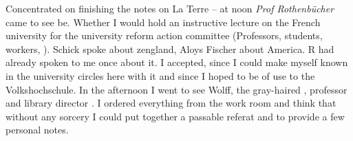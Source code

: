 
Concentrated on finishing the notes on La Terre -- at noon \textit{Prof Rothenbücher} came to see be. Whether I would hold an instructive lecture on the French university for the university reform action committee (Professors, students, workers, ). Schick spoke about zengland, Aloys Fischer about America. R had already spoken to me once about it. I accepted, since I could make myself known in the university circles here with it and since I hoped to be of use to the Volkshochschule. In the afternoon I went to see Wolff, the gray-haired , professor and library director . I ordered everything from the work room and think that without any sorcery I could put together a passable referat and to provide a few personal notes. \missing